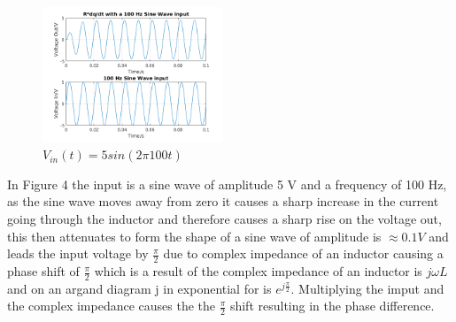 \documentclass[10pt,a4paper]{article}
\begin{document}
\begin{figure}
    \vspace{-5mm}
  		\includegraphics[width=0.48\textwidth]{Ex3_Figs/100Sine.png}
	\vspace{-6mm}
  	\caption{$V_{in}(t)= 5sin(2 \pi 100t)$}
  	\label{fig:ex3g3}
\end{figure}
\vspace{5mm}In Figure 4 the input is a sine wave of amplitude 5 V and a frequency of 100 Hz, as the sine wave moves away from zero it causes a sharp increase in the current going through the inductor and therefore causes a sharp rise on the voltage out, this then attenuates to form the shape of a sine wave of amplitude is $\approx 0.1 V$ and leads the input voltage by $\frac{\pi}{2}$ due to complex impedance of an inductor causing a phase shift of $\frac{\pi}{2}$ which is a result of the complex impedance of an inductor is $j\omega L$ and on an argand diagram j in exponential for is $e^{j\frac{\pi}{2}}$. Multiplying the imput and the complex impedance causes the the $\frac{\pi}{2}$ shift resulting in the phase difference.
%
%
%
%
%
%
%
%
%
%
\end{document}
